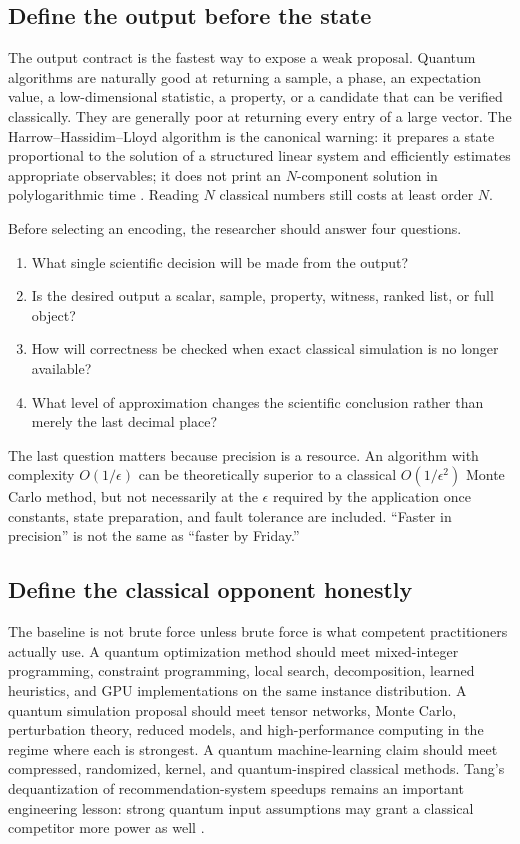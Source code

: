 \subsection{Define the output before the state}

The output contract is the fastest way to expose a weak proposal. Quantum algorithms are naturally good at returning a sample, a phase, an expectation value, a low-dimensional statistic, a property, or a candidate that can be verified classically. They are generally poor at returning every entry of a large vector. The Harrow--Hassidim--Lloyd algorithm is the canonical warning: it prepares a state proportional to the solution of a structured linear system and efficiently estimates appropriate observables; it does not print an $N$-component solution in polylogarithmic time \citep{harrow2009}. Reading $N$ classical numbers still costs at least order $N$.

Before selecting an encoding, the researcher should answer four questions.

\begin{enumerate}
  \item What single scientific decision will be made from the output?
  \item Is the desired output a scalar, sample, property, witness, ranked list, or full object?
  \item How will correctness be checked when exact classical simulation is no longer available?
  \item What level of approximation changes the scientific conclusion rather than merely the last decimal place?
\end{enumerate}

The last question matters because precision is a resource. An algorithm with complexity $O(1/\epsilon)$ can be theoretically superior to a classical $O(1/\epsilon^2)$ Monte Carlo method, but not necessarily at the $\epsilon$ required by the application once constants, state preparation, and fault tolerance are included. ``Faster in precision'' is not the same as ``faster by Friday.''

\subsection{Define the classical opponent honestly}

The baseline is not brute force unless brute force is what competent practitioners actually use. A quantum optimization method should meet mixed-integer programming, constraint programming, local search, decomposition, learned heuristics, and GPU implementations on the same instance distribution. A quantum simulation proposal should meet tensor networks, Monte Carlo, perturbation theory, reduced models, and high-performance computing in the regime where each is strongest. A quantum machine-learning claim should meet compressed, randomized, kernel, and quantum-inspired classical methods. Tang's dequantization of recommendation-system speedups remains an important engineering lesson: strong quantum input assumptions may grant a classical competitor more power as well \citep{tang2019,tang2021}.

